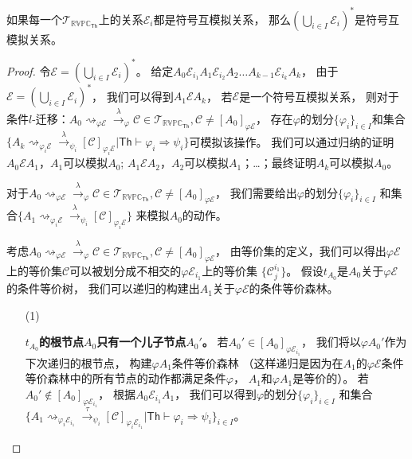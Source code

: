 \begin{lemma}\label{lemma:closure}
   如果每一个$\mathcal{T}_{\mathbb{RVPC}_{\mathsf{Th}}}$上的关系$\mathcal{E}_i$都是符号互模拟关系，
   那么$(\bigcup_{i\in I}\mathcal{E}_i)^*$是符号互模拟关系。
\end{lemma}
\begin{proof}
   令$\mathcal{E}=(\bigcup_{i\in I}\mathcal{E}_i)^*$。
   给定$A_0\mathcal{E}_{i_1}A_1\mathcal{E}_{i_2}A_2\dots A_{k-1}\mathcal{E}_{i_k} A_k$，
   由于$\mathcal{E}=(\bigcup_{i\in I}\mathcal{E}_{i})^*$，
   我们可以得到$A_1\mathcal{E}A_k$，
   若$\mathcal{E}$是一个符号互模拟关系，
   则对于条件$l$-迁移：$A_0\rightsquigarrow_{\varphi\mathcal{E}}\stackrel{\lambda}{\rightarrow}_{\varphi} \mathcal{C}\in \mathcal{T}_{\mathbb{RVPC}_{\mathsf{Th}}},\mathcal{C}\neq [A_0]_{\varphi\mathcal{E}}$，
   存在$\varphi$的划分$\{\varphi_i\}_{i\in I}$和集合
   $\{A_k\rightsquigarrow_{\varphi_i\mathcal{E}}\stackrel{\lambda}{\rightarrow}_{\psi_i}[\mathcal{C}]_{\varphi_i\mathcal{E}}|\mathsf{Th}\vdash \varphi_i\Rightarrow\psi_i\}$可模拟该操作。
   我们可以通过归纳的证明$A_0\mathcal{E}A_1$，$A_1$可以模拟$A_0$;
   $A_1\mathcal{E}A_2$，$A_2$可以模拟$A_1$；\dots；最终证明$A_k$可以模拟$A_0$。

   对于$A_0\rightsquigarrow_{\varphi\mathcal{E}}\stackrel{\lambda}{\rightarrow}_{\varphi} \mathcal{C}\in \mathcal{T}_{\mathbb{RVPC}_{\mathsf{Th}}},\mathcal{C}\neq [A_0]_{\varphi\mathcal{E}}$，
   我们需要给出$\varphi$的划分$\{\varphi_i\}_{i\in I}$
   和集合$\{A_1\rightsquigarrow_{\varphi_i\mathcal{E}}\stackrel{\lambda}{\rightarrow}_{\psi_i}[\mathcal{C}]_{\varphi_i\mathcal{E}}\}$
   来模拟$A_0$的动作。

   考虑$A_0\rightsquigarrow_{\varphi\mathcal{E}}\stackrel{\lambda}{\rightarrow}_{\varphi} \mathcal{C}\in \mathcal{T}_{\mathbb{RVPC}_{\mathsf{Th}}},\mathcal{C}\neq [A_0]_{\varphi\mathcal{E}}$，
   由等价集的定义，我们可以得出$\varphi\mathcal{E}$上的等价集$\mathcal{C}$可以被划分成不相交的$\varphi\mathcal{E}_{i_1}$上的等价集
   $\{\mathcal{C}_j^{i_1}\}$。
   假设$t_{A_0}$是$A_0$关于$\varphi\mathcal{E}$的条件等价树，
   我们可以递归的构建出$A_1$关于$\varphi\mathcal{E}$的条件等价森林。

   \begin{itemize}
      \item[(1)] {
         \textbf{$t_{A_0}$的根节点$A_0$只有一个儿子节点$A_0'$。}
         若$A_0'\in[A_0]_{\varphi\mathcal{E}_{i_1}}$，
         我们将以$\varphi A_0'$作为下次递归的根节点，
         构建$\varphi A_1$条件等价森林
         （这样递归是因为在$A_1$的$\varphi\mathcal{E}$条件等价森林中的所有节点的动作都满足条件$\varphi$，
         $A_1$和$\varphi A_1$是等价的）。
         若$A_0'\notin[A_0]_{\varphi\mathcal{E}_{i_1}}$，
         根据$A_0\mathcal{E}_{i_1}A_1$，
         我们可以得到$\varphi$的划分$\{\varphi_i\}_{i\in I}$
         和集合$\{A_1\rightsquigarrow_{\varphi_i\mathcal{E}_{i_1}}\stackrel{\tau}{\rightarrow}_{\psi_i}[\mathcal{C}]_{\varphi_i\mathcal{E}_{i_1}}|\mathsf{Th}\vdash \varphi_i\Rightarrow \psi_i\}_{i\in I}$。
         
}
\end{itemize}
\end{proof}
